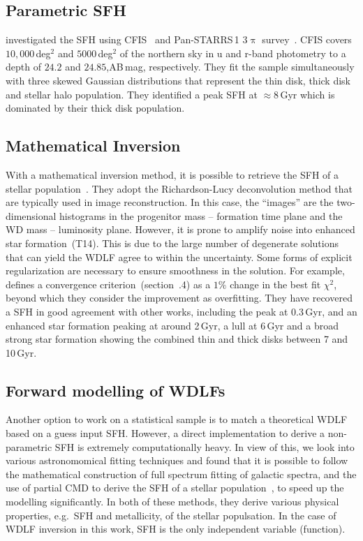 \documentclass[fleqn,usenatbib]{mnras}
\begin{document}
\subsection{Parametric SFH}
\citet{2019ApJ...887..148F} investigated the SFH using
CFIS~\citep{2017ApJ...848..128I} and Pan-STARRS\,1 3$\uppi$
survey~\citep{2016arXiv161205560C}. CFIS covers $10,000$\,deg$^2$ and
$5000$\,deg$^2$ of the northern sky in u and r-band photometry to a depth of
$24.2$ and $24.85$,AB\,mag, respectively. They fit the sample simultaneously
with three skewed Gaussian distributions that represent the thin disk, thick
disk and stellar halo population. They identified a peak SFH at $\approx8$\,Gyr
which is dominated by their thick disk population.

\subsection{Mathematical Inversion}
With a mathematical inversion method, it is possible to retrieve the SFH of a
stellar population~\citep{2013MNRAS.434.1549R}. They adopt the Richardson-Lucy 
deconvolution method that are typically used in image reconstruction. In this
case, the ``images'' are the two-dimensional histograms in the
progenitor mass -- formation time plane and the WD mass -- luminosity plane. 
However, it is prone to amplify noise into enhanced star 
formation~(T14). This is due to the large number of
degenerate solutions that can yield the WDLF agree to within the uncertainty.
Some forms of explicit regularization are necessary to ensure smoothness in the
solution. For example, \citet{2013MNRAS.434.1549R} defines a convergence
criterion~(section~.4) as a $1\%$ change in the best fit
$\chi^2$, beyond which they consider the improvement as overfitting. They have 
recovered a SFH in good agreement with other works, including the peak at
0.3\,Gyr, and an enhanced star formation peaking at around 2\,Gyr, a lull at
6\,Gyr and a broad strong star formation showing the combined thin and thick
disks between 7 and 10\,Gyr.

\subsection{Forward modelling of WDLFs}
Another option to work on a statistical sample is to match a theoretical
WDLF based on a guess input SFH. However, a direct implementation to derive a
non-parametric SFH is extremely computationally heavy. In view of this, we look
into various astronomomical fitting techniques and found that it is possible to
follow the mathematical construction of full spectrum fitting of galactic
spectra, and the use of partial CMD to derive the SFH of a stellar
population~\citep{2006A&A...459..783C}, to speed up the modelling significantly.
In both of these methods, they derive various physical properties, e.g.\ SFH and
metallicity, of the stellar populsation. In the case of WDLF inversion in this
work, SFH is the only independent variable (function).
\end{document}
